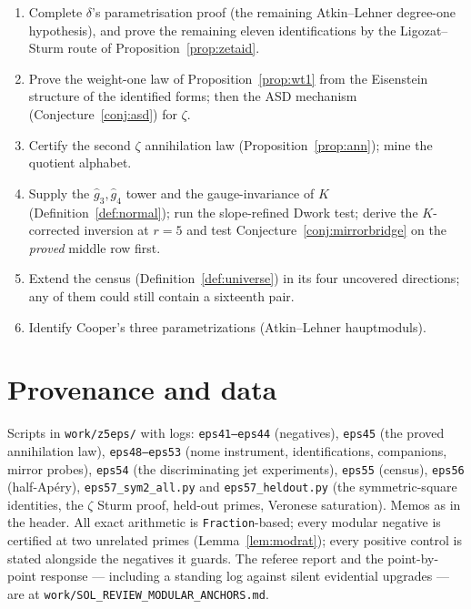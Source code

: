 \documentclass[11pt,reqno]{amsart}
\theoremstyle{plain}
\theoremstyle{definition}
\theoremstyle{remark}
\begin{document}
\begin{enumerate}[leftmargin=2em,label=\textbf{P\arabic*.}]
\item Complete $\delta$'s parametrisation proof (the remaining
Atkin--Lehner degree-one hypothesis), and prove the remaining eleven
identifications by the Ligozat--Sturm route of
Proposition~\ref{prop:zetaid}.
\item Prove the weight-one law of Proposition~\ref{prop:wt1} from the
Eisenstein structure of the identified forms; then the ASD mechanism
(Conjecture~\ref{conj:asd}) for $\zeta$.
\item Certify the second $\zeta$ annihilation law
(Proposition~\ref{prop:ann}); mine the quotient alphabet.
\item Supply the $\hat g_3,\hat g_4$ tower and the gauge-invariance of
$K$ (Definition~\ref{def:normal}); run the slope-refined Dwork test;
derive the $K$-corrected inversion at $r=5$ and test
Conjecture~\ref{conj:mirrorbridge} on the \emph{proved} middle row first.
\item Extend the census (Definition~\ref{def:universe}) in its four
uncovered directions; any of them could still contain a sixteenth pair.
\item Identify Cooper's three parametrizations (Atkin--Lehner
hauptmoduls).
\end{enumerate}

\section{Provenance and data}\label{sec:provenance}

Scripts in \texttt{work/z5eps/} with logs: \texttt{eps41--eps44}
(negatives), \texttt{eps45} (the proved annihilation law),
\texttt{eps48--eps53} (nome instrument, identifications, companions,
mirror probes), \texttt{eps54} (the discriminating jet experiments),
\texttt{eps55} (census), \texttt{eps56} (half-Ap\'ery),
\texttt{eps57\_sym2\_all.py} and \texttt{eps57\_heldout.py} (the
symmetric-square identities, the $\zeta$ Sturm proof, held-out primes,
Veronese saturation). Memos as in the header. All exact arithmetic is
\texttt{Fraction}-based; every modular negative is certified at two
unrelated primes (Lemma~\ref{lem:modrat}); every positive control is
stated alongside the negatives it guards. The referee report and the
point-by-point response --- including a standing log against silent
evidential upgrades --- are at
\texttt{work/SOL\_REVIEW\_MODULAR\_ANCHORS.md}.
\end{document}
